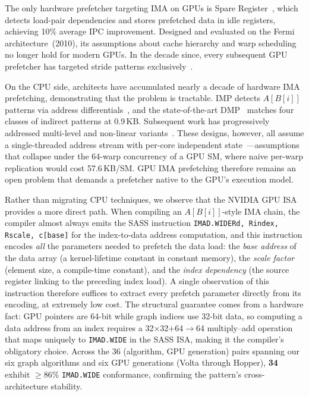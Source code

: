 \documentclass[sigconf, screen, review]{acmart}
\begin{document}
The only hardware prefetcher targeting IMA on GPUs is Spare
Register~\cite{lakshminarayana2014spare}, which detects load-pair
dependencies and stores prefetched data in idle registers, achieving
10\% average IPC improvement.
Designed and evaluated on the Fermi architecture~(2010), its
assumptions about cache hierarchy and warp scheduling no longer hold
for modern GPUs.
In the decade since, every subsequent GPU prefetcher has targeted
stride patterns exclusively~\cite{koo2018caps, oh2018wasp,
mostofi2023snake}.

On the CPU side, architects have accumulated nearly a decade of
hardware IMA prefetching, demonstrating that the problem is tractable.
IMP detects $A[B[i]]$ patterns via address
differentials~\cite{yu2015imp}, and the state-of-the-art
DMP~\cite{fu2024dmp} matches four classes of indirect patterns at
0.9\,KB.
Subsequent work has progressively addressed multi-level and
non-linear variants~\cite{cavus2020atp, kaushik2021gretch,
xue2024tyche, talati2021prodigy}.
These designs, however, all assume a single-threaded address stream
with per-core independent
state~\cite{ainsworth2019indirect}---assumptions that collapse under
the 64-warp concurrency of a GPU SM, where naive per-warp
replication would cost 57.6\,KB/SM.
GPU IMA prefetching therefore remains an open problem that demands a
prefetcher native to the GPU's execution model.

Rather than migrating CPU techniques, we observe that the NVIDIA
GPU ISA provides a more direct path.
When compiling an $A[B[i]]$-style IMA chain, the compiler almost
always emits the SASS instruction
\texttt{IMAD.WIDE\;Rd, Rindex, Rscale, c[base]} for the index-to-data
address computation, and this instruction encodes \emph{all} the
parameters needed to prefetch the data load:
the \emph{base address} of the data array (a kernel-lifetime constant
in constant memory), the \emph{scale factor} (element size, a
compile-time constant), and the \emph{index dependency} (the source
register linking to the preceding index load).
A single observation of this instruction therefore suffices to
extract every prefetch parameter directly from its encoding, at
extremely low cost.
The structural guarantee comes from a hardware fact: GPU pointers
are 64-bit while graph indices use 32-bit data, so computing a data
address from an index requires a 32$\times$32$+$64$\to$64
multiply--add operation that maps uniquely to \texttt{IMAD.WIDE} in
the SASS ISA, making it the compiler's obligatory choice.
Across the 36 (algorithm, GPU generation) pairs spanning our six
graph algorithms and six GPU generations (Volta through Hopper),
\textbf{34} exhibit $\geq$86\% \texttt{IMAD.WIDE} conformance,
confirming the pattern's cross-architecture stability.
\end{document}
